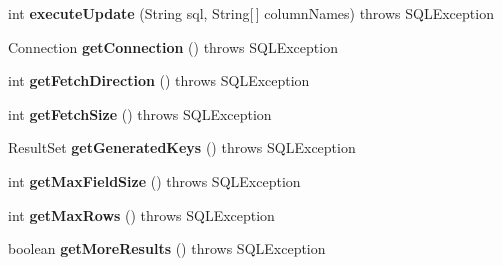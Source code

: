 \begin{DoxyCompactItemize}
\mbox{\label{classsimpledb_1_1jdbc_1_1StatementAdapter_a2044fb8ed744b48afa4f5d4816cd156e}} 
int {\bfseries execute\+Update} (String sql, String\mbox{[}$\,$\mbox{]} column\+Names)  throws S\+Q\+L\+Exception 
\item 
\mbox{\label{classsimpledb_1_1jdbc_1_1StatementAdapter_a86e7452c9ccffba177d2b4c74b24aa2e}} 
Connection {\bfseries get\+Connection} ()  throws S\+Q\+L\+Exception 
\item 
\mbox{\label{classsimpledb_1_1jdbc_1_1StatementAdapter_ad15fa1ba22bf89b240db1a3b01d59898}} 
int {\bfseries get\+Fetch\+Direction} ()  throws S\+Q\+L\+Exception 
\item 
\mbox{\label{classsimpledb_1_1jdbc_1_1StatementAdapter_a6961529d8f914428d3b52d0178cf6771}} 
int {\bfseries get\+Fetch\+Size} ()  throws S\+Q\+L\+Exception 
\item 
\mbox{\label{classsimpledb_1_1jdbc_1_1StatementAdapter_a3a5d3606fce91340907d920a5f40aec3}} 
Result\+Set {\bfseries get\+Generated\+Keys} ()  throws S\+Q\+L\+Exception 
\item 
\mbox{\label{classsimpledb_1_1jdbc_1_1StatementAdapter_a099f6507a5887d56faf3ac88f7aa65e7}} 
int {\bfseries get\+Max\+Field\+Size} ()  throws S\+Q\+L\+Exception 
\item 
\mbox{\label{classsimpledb_1_1jdbc_1_1StatementAdapter_a4b0cc6e26502a752f7c26095b1334ef8}} 
int {\bfseries get\+Max\+Rows} ()  throws S\+Q\+L\+Exception 
\item 
\mbox{\label{classsimpledb_1_1jdbc_1_1StatementAdapter_ab3672a779562db9f1c73d5b57158d750}} 
boolean {\bfseries get\+More\+Results} ()  throws S\+Q\+L\+Exception 
\item 
\mbox{\label{classsimpledb_1_1jdbc_1_1StatementAdapter_a3f5582aa85502edd180e93801f1479c4}} 

\end{DoxyCompactItemize}
